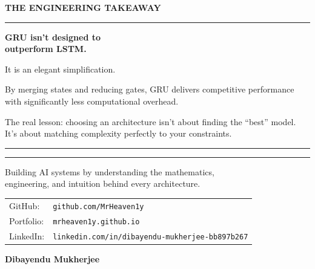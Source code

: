 \documentclass[11pt]{article}
\begin{document}
\begin{center}

{\fontsize{14}{16}\selectfont\color{brandblue}\textbf{THE ENGINEERING TAKEAWAY}}

\vspace{0.3in}

\begin{minipage}{0.88\textwidth}
\centering

{\color{brandblue}\rule{6cm}{1pt}}

\vspace{0.2in}

{\fontsize{24}{28}\selectfont\bfseries\color{brandnavy}
GRU isn't designed to\\
outperform LSTM.
}

\vspace{0.15in}

{\fontsize{12}{14}\selectfont\color{brandgray}
It is an elegant simplification.

\vspace{0.1in}
By merging states and reducing gates, GRU delivers competitive performance
with significantly less computational overhead.

\vspace{0.1in}
The real lesson: choosing an architecture isn't about finding the ``best'' model. It's about matching complexity perfectly to your constraints.
}

\vspace{0.2in}

{\color{brandblue}\rule{6cm}{1pt}}

\end{minipage}

\end{center}

\vfill

\begin{center}

\rule{0.6\textwidth}{0.5pt}

\vspace{0.12in}

{\fontsize{11}{13}\selectfont\color{brandgray}
Building AI systems by understanding the mathematics,\\
engineering, and intuition behind every architecture.
}

\vspace{0.12in}

{\fontsize{10}{12}\selectfont\color{brandgray}
\begin{tabular}{@{}l l}
GitHub: & \texttt{github.com/MrHeaven1y} \\
Portfolio: & \texttt{mrheaven1y.github.io} \\
LinkedIn: & \texttt{linkedin.com/in/dibayendu-mukherjee-bb897b267}
\end{tabular}
}

\vspace{0.12in}

{\fontsize{14}{16}\selectfont\color{brandnavy}\textbf{Dibayendu Mukherjee}}

\end{center}

\vspace*{0.2in}
\end{document}
